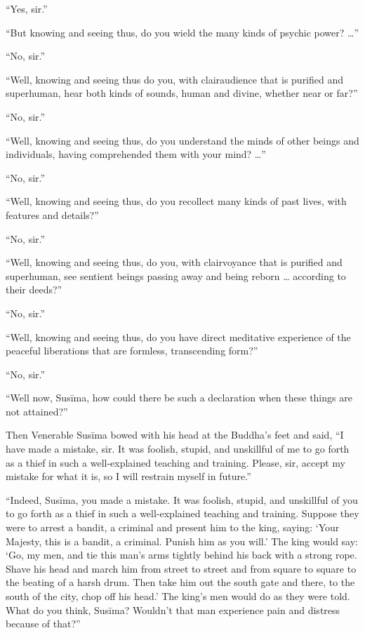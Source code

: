 \documentclass[12pt,openany]{book}%
\begin{document}
“Yes, sir.” 

“But knowing and seeing thus, do you wield the many kinds of psychic power? …” 

“No, sir.” 

“Well, knowing and seeing thus do you, with clairaudience that is purified and superhuman, hear both kinds of sounds, human and divine, whether near or far?” 

“No, sir.” 

“Well, knowing and seeing thus, do you understand the minds of other beings and individuals, having comprehended them with your mind? …” 

“No, sir.” 

“Well, knowing and seeing thus, do you recollect many kinds of past lives, with features and details?” 

“No, sir.” 

“Well, knowing and seeing thus, do you, with clairvoyance that is purified and superhuman, see sentient beings passing away and being reborn … according to their deeds?” 

“No, sir.” 

“Well, knowing and seeing thus, do you have direct meditative experience of the peaceful liberations that are formless, transcending form?” 

“No, sir.” 

“Well now, \textsanskrit{Susīma}, how could there be such a declaration when these things are not attained?” 

Then Venerable \textsanskrit{Susīma} bowed with his head at the Buddha’s feet and said, “I have made a mistake, sir. It was foolish, stupid, and unskillful of me to go forth as a thief in such a well-explained teaching and training. Please, sir, accept my mistake for what it is, so I will restrain myself in future.” 

“Indeed, \textsanskrit{Susīma}, you made a mistake. It was foolish, stupid, and unskillful of you to go forth as a thief in such a well-explained teaching and training. Suppose they were to arrest a bandit, a criminal and present him to the king, saying: ‘Your Majesty, this is a bandit, a criminal. Punish him as you will.’ The king would say: ‘Go, my men, and tie this man’s arms tightly behind his back with a strong rope. Shave his head and march him from street to street and from square to square to the beating of a harsh drum. Then take him out the south gate and there, to the south of the city, chop off his head.’ The king’s men would do as they were told. What do you think, \textsanskrit{Susīma}? Wouldn’t that man experience pain and distress because of that?” 
\end{document}
